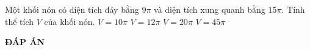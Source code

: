 \begin{ex}%
Một khối nón có diện tích đáy bằng $9\pi $ và diện tích xung quanh bằng $15\pi $. Tính thể tích $V$ của khối nón.
\choice
{$V=10\pi $}
{\True $V=12\pi $}
{$V=20\pi $}
{$V=45\pi $}
\end{ex}

\newpage
\begin{center}
	\textbf{ĐÁP ÁN}
\end{center}
\begin{multicols}{10}
 
\end{multicols}
